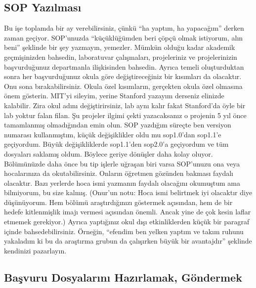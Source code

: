 \documentclass[12pt]{article}
\begin{document}
\subsection{SOP Yazılması}
Bu işe toplamda bir ay verebilirsiniz, çünkü “ha yaptım, ha yapacağım” derken zaman geçiyor. SOP’unuzda “küçüklüğümden beri çöpçü olmak istiyorum, alın beni” şeklinde bir şey yazmayın, yemezler. Mümkün olduğu kadar akademik geçmişinizden bahsedin, laboratuvar çalışmaları, projeleriniz ve projelerinizin başvurduğunuz departmanla ilişkisinden bahsedin. Ayrıca temeli oluşturduktan sonra her başvurduğunuz okula göre değiştireceğiniz bir kısımları da olacaktır. Onu sona bırakabilirsiniz. Okula özel kısımların, gerçekten okula özel olmasına önem gösterin. MIT’yi sileyim, yerine Stanford yazayım derseniz elinizde kalabilir. Zira okul adını değiştirirsiniz, lab aynı kalır fakat Stanford’da öyle bir lab yoktur falan filan. Şu projeler ilgimi çekti yazacaksanız o projenin 5 yıl önce tamamlanmış olmadığından emin olun. SOP yazdığım süreçte ben versiyon numarası kullanmıştım, küçük değişiklikler oldu mu sop1.0’dan sop1.1’e geçiyordum. Büyük değişikliklerde sop1.1’den sop2.0’a geçiyordum ve tüm dosyaları saklamış oldum. Böylece geriye dönüşler daha kolay oluyor. Bölümünüzde daha önce bu tip işlerle uğraşan biri varsa SOP’unuzu ona veya hocalarınıza da okutabilirsiniz. Onların öğretmen gözünden bakması faydalı olacaktır. Bazı yerlerde hoca ismi yazmanın faydalı olacağını okumuştum ama bilmiyorum, bu size kalmış. (Onur’un notu: Hoca ismi belirtmek iyi olacaktır diye düşünüyorum. Hem bölümü araştırdığınızı göstermek açısından, hem de bir hedefe kitlenmişlik imajı vermesi açısından önemli. Ancak yine de çok kesin laflar etmemek gerekiyor.) Ayrıca yaptığınız okul dışı etkinliklerden küçük bir paragraf içinde bahsedebilirsiniz. Örneğin, “efendim ben yelken yaptım ve takım ruhunu yakaladım ki bu da araştırma grubun da çalışırken büyük bir avantajdır” şeklinde kendinizi pazarlayın.

\subsection{Başvuru Dosyalarını Hazırlamak, Göndermek}
\end{document}
